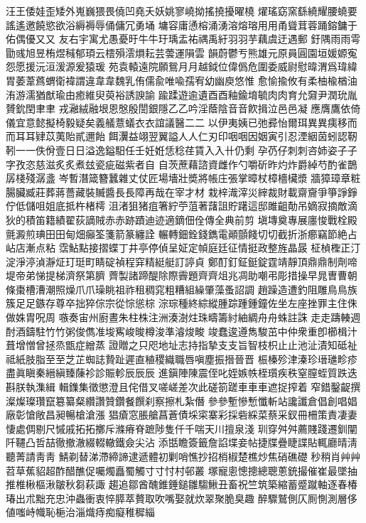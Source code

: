 汪王倭娃歪矮外嵬巍猥畏僥凹堯夭妖姚寥嶢拗搖撓擾曜橈
燿瑤窈窯繇繞耀腰蟯要謠遙邀饒慾欲浴縟褥辱俑傭冗勇埇
墉容庸慂榕涌湧溶熔瑢⽤用甬聳茸蓉踊鎔鏞于佑偶優⼜又
友右宇寓尤愚憂旴⽜牛玗瑀盂祐禑禹紆⽻羽芋藕虞迂遇郵
釪隅⾬雨雩勖彧旭昱栯煜稶郁頊云橒殞澐熉耘芸蕓運隕雲
韻蔚鬱亐熊雄元原員圓園垣媛嫄寃怨愿援沅洹湲源爰猿瑗
苑袁轅遠院願鴛⽉月越鉞位偉僞危圍委威尉慰暐渭爲瑋緯
胃萎葦蔿蝟衛褘謂違⾱韋魏乳侑儒兪唯喩孺宥幼幽庾悠惟
愈愉揄攸有柔柚楡楢油洧游濡猶猷瑜由癒維臾萸裕誘諛諭
踰蹂遊逾遺⾣酉釉鍮堉毓⾁肉育允奫尹潤玧胤贇鈗閏⾀聿
戎瀜絨融垠恩慇殷誾銀隱⼄乙吟淫蔭陰⾳音飮揖泣⾢邑凝
應膺鷹依倚儀宜意懿擬椅毅疑矣義艤薏蟻⾐衣誼議醫⼆二
以伊夷姨已弛彛怡爾珥異異痍移⽽而⽿耳肄苡荑貽貳邇飴
餌瀷益翊翌翼謚⼈人仁刃印咽咽因姻寅引忍湮絪茵蚓認靭
靷⼀一佚佾壹⽇日溢逸鎰馹任壬妊姙恁稔荏賃⼊入卄仍剩
孕芿仔刺刺咨姉姿⼦子字孜恣慈滋炙炙煮玆瓷疵磁紫者⾃
自茨蔗藉諮資雌作勺嚼斫昨灼炸爵綽芍酌雀鵲孱棧殘潺盞
岑暫潛箴簪蠶雜丈仗匠場墻壯奬將帳庄張掌暲杖樟檣欌漿
牆獐璋章粧腸臟臧莊葬蔣薔藏裝贓醬⾧長障再哉在宰才材
栽梓渽滓災縡裁財載齋齎爭箏諍錚佇低儲咀姐底抵杵楮樗
沮渚狙猪疽箸紵苧菹著藷詛貯躇這邸雎齟勣吊嫡寂摘敵滴
狄的積笛籍績翟荻謫賊⾚赤跡蹟迪迹適鏑佃佺傳全典前剪
塡塼奠專展廛悛戰栓殿氈澱煎琠⽥田甸畑癲筌箋箭篆纏詮
輾轉鈿銓錢鐫電顚顫餞切切截折浙癤竊節絶占岾店漸点粘
霑鮎點接摺蝶丁井亭停偵呈姃定幀庭廷征情挺政整旌晶晸
柾楨檉正汀淀淨渟湞瀞炡玎珽町睛碇禎程穽精綎艇訂諪貞
鄭酊釘鉦鋌錠霆靖靜頂⿍鼎制劑啼堤帝弟悌提梯濟祭第臍
薺製諸蹄醍除際霽題⿑齊俎兆凋助嘲弔彫措操早晁曺曹朝
條棗槽漕潮照燥⽖爪璪眺祖祚租稠窕粗糟組繰肇藻蚤詔調
趙躁造遭釣阻雕⿃鳥族簇⾜足鏃存尊卒拙猝倧宗從悰慫棕
淙琮種終綜縱腫踪踵鍾鐘佐坐左座挫罪主住侏做姝胄呪周
嗾奏宙州廚晝朱柱株注洲湊澍炷珠疇籌紂紬綢⾈舟蛛註誅
⾛走躊輳週酎酒鑄駐⽵竹粥俊儁准埈寯峻晙樽浚準濬焌畯
竣蠢逡遵雋駿茁中仲衆重卽櫛楫汁葺增憎曾拯烝甑症繒蒸
證贈之只咫地址志持指摯⽀支旨智枝枳⽌止池沚漬知砥祉
祗紙肢脂⾄至芝芷蜘誌贄趾遲直稙稷織職唇嗔塵振搢晉晋
桭榛殄津溱珍瑨璡畛疹盡眞瞋秦縉縝臻蔯袗診賑軫⾠辰辰
進鎭陣陳震侄叱姪嫉帙桎瓆疾秩窒膣蛭質跌迭斟朕執潗緝
輯鏶集徵懲澄且侘借叉嗟嵯差次此磋箚蹉⾞車車遮捉搾着
窄錯鑿齪撰澯燦璨瓚竄簒纂粲纘讚贊鑽餐饌刹察擦札紮僭
參參塹慘慙懺斬站讒讖倉倡創唱娼廠彰愴敞昌昶暢槍滄漲
猖瘡窓脹艙菖蒼債埰寀寨彩採砦綵菜蔡采釵冊柵策責凄妻
悽處倜剔尺慽戚拓拓擲斥滌瘠脊蹠陟隻仟千喘天川擅泉淺
玔穿⾇舛薦賤踐遷釧闡阡韆凸哲喆徹撤澈綴輟轍鐵僉尖沾
添甛瞻簽籤詹諂堞妾帖捷牒疊睫諜貼輒廳晴淸聽菁請⾭靑
鯖剃替涕滯締諦逮遞體初剿哨憔抄招梢椒楚樵炒焦硝礁礎
秒稍肖⾋艸苕草蕉貂超酢醋醮促囑燭矗蜀觸⼨寸忖村邨叢
塚寵悤憁摠總聰蔥銃撮催崔最墜抽推椎楸樞湫皺秋芻萩諏
趨追鄒酋醜錐錘鎚雛騶鰍丑畜祝竺筑築縮蓄蹙蹴軸逐春椿
瑃出朮黜充忠沖蟲衝衷悴膵萃贅取吹嘴娶就炊翠聚脆臭趣
醉驟鷲側仄厠惻測層侈値嗤峙幟恥梔治淄熾痔痴癡稚穉緇
